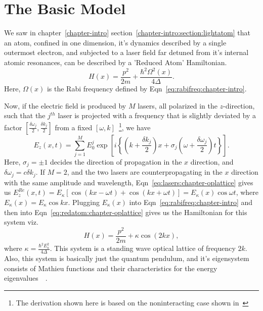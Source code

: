 \section{\label{sec:2}The Basic Model}
We saw in chapter~\ref{chapter-intro} section~\ref{chapter-intro:section:lightatom} that an atom, confined in one dimension, it's dynamics described by a single outermost electron, and subjected to a laser field far detuned from it's internal atomic resonances, can be described by a 'Reduced Atom' Hamiltonian.
\begin{equation}
H(x)=\frac{p^2}{2m}+\frac{\hbar^2 \Omega^2(x)}{4\Delta}.
\label{eq:redatom:chapter-oplattice}
\end{equation}
Here, $\Omega(x)$ is the Rabi frequency defined by Eqn~\ref{eq:rabifreq:chapter-intro}. 

Now, if the electric field is produced by $M$ lasers, all polarized in the $z$-direction, such that the $j^{th}$ laser is projected with a frequency that is slightly deviated by a factor $\left[ \frac{\delta \omega_j}{2},\frac{ \delta k_j}{2} \right]$  from a fixed $\left[ \omega,k \right]$~\footnote{The derivation shown here is based on the noninteracting case shown in~\cite{holder:thesis}}, we have
\begin{equation}
E_z(x,t) = \sum^{M}_{j=1} E^{j}_0 \exp{\left[ i \left\{ \left( k+\frac{\delta k_j}{2} \right)x + \sigma_j \left(\omega+\frac{\delta \omega_j}{2} \right)t \right\} \right]}.
\label{eq:lasers:chapter-oplattice}
\end{equation}
Here, $\sigma_j=\pm 1$ decides the direction of propagation in the $x$ direction, and $\delta \omega_j=c\delta k_j$. If $M=2$, and the two lasers are counterpropagating in the $x$ direction with the same amplitude and wavelength, Eqn~\ref{eq:lasers:chapter-oplattice} gives us $E^{Re}_z(x,t)=E_\kappa \left[ \cos{\left(kx-\omega t \right)} +\cos{\left(kx+ \omega t \right)} \right]=E_\kappa(x) \cos{\omega t}$, where $E_\kappa(x)=E_\kappa \cos{kx}$. Plugging $E_\kappa(x)$ into Eqn~\ref{eq:rabifreq:chapter-intro} and then into Eqn~\ref{eq:redatom:chapter-oplattice} gives us the Hamiltonian for this system viz.
\begin{equation}
H(x)=\frac{p^2}{2m}+\kappa \cos{\left( 2 kx \right)},
\label{eq:standingwave:chapter-oplattice}
\end{equation}
where $\kappa=\frac{\hbar^2 E^2_\kappa}{4\Delta}$. This system is a standing wave optical lattice of frequency $2 k$. Also, this system is basically just the quantum pendulum, and it's eigensystem consists of Mathieu functions and their characteristics for the energy eigenvalues~\cite{reichl}~\cite{abramowitz:stegun}. 

